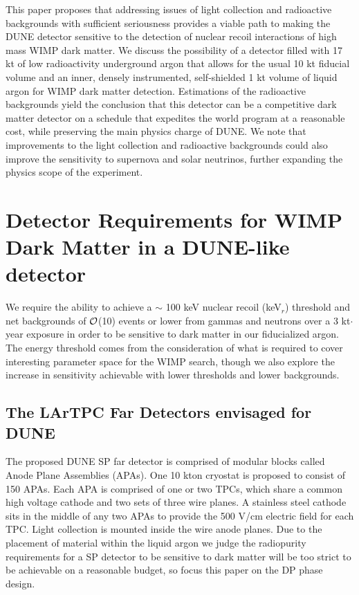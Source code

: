 \documentclass[a4paper,11pt]{article}
\begin{document}
This paper proposes that addressing issues of light collection and radioactive backgrounds with sufficient seriousness provides a viable path to making the DUNE detector sensitive to the detection of nuclear recoil interactions of high mass WIMP dark matter. We discuss the possibility of a detector filled with 17 kt of low radioactivity underground argon that allows for the usual 10 kt fiducial volume and an inner, densely instrumented, self-shielded 1 kt volume of liquid argon for WIMP dark matter detection. Estimations of the radioactive backgrounds yield the conclusion that this detector can be a competitive dark matter detector on a schedule that expedites the world program at a reasonable cost, while preserving the main physics charge of DUNE.
We note that improvements to the light collection and radioactive backgrounds could also improve the sensitivity to supernova and solar neutrinos, further expanding the physics scope of the experiment.

\section{Detector Requirements for WIMP Dark Matter in a DUNE-like detector}
We require the ability to achieve a $\sim$ 100 keV nuclear recoil (keV$_r$) threshold and net backgrounds of $\cal{O}$(10) events or lower from gammas and neutrons over a 3 kt$\cdot$year exposure in order to be sensitive to dark matter in our fiducialized argon. The energy threshold comes from the consideration of what is required to cover interesting parameter space for the WIMP search, though we also explore the increase in sensitivity achievable with lower thresholds and lower backgrounds.

\subsection {The LArTPC Far Detectors envisaged for DUNE}

The proposed DUNE SP far detector is comprised of modular blocks called Anode Plane Assemblies (APAs). One 10 kton cryostat is proposed to consist of 150 APAs. Each APA is comprised of one or two TPCs, which share a common high voltage cathode and two sets of three wire planes. A stainless steel cathode sits in the middle of any two APAs to provide the 500 V/cm electric field for each TPC. Light collection is mounted inside the wire anode planes. Due to the placement of material within the liquid argon we judge the radiopurity requirements for a SP detector to be sensitive to dark matter will be too strict to be achievable on a reasonable budget, so focus this paper on the DP phase design. 
\end{document}
